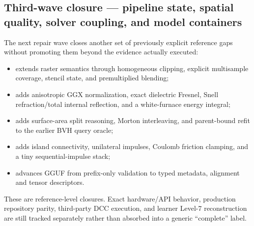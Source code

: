 \subsection{Third-wave closure --- pipeline state, spatial quality, solver coupling, and model containers}\label{appendix-2358b21a702d-third-wave-closure-pipeline-state-spatial-quality-solver-coupling-and-model-containers}

\hypertarget{appendix-2358b21a702d-third-wave-closure-pipeline-state-spatial-quality-solver-coupling-and-model-containers}{}

The next repair wave closes another set of previously explicit reference gaps without promoting them beyond the evidence actually executed:

\begin{itemize}
\tightlist
\item
   extends raster semantics through homogeneous clipping, explicit multisample coverage, stencil state, and premultiplied blending;
\item
   adds anisotropic GGX normalization, exact dielectric Fresnel, Snell refraction/total internal reflection, and a white-furnace energy integral;
\item
   adds surface-area split reasoning, Morton interleaving, and parent-bound refit to the earlier BVH query oracle;
\item
   adds island connectivity, unilateral impulses, Coulomb friction clamping, and a tiny sequential-impulse stack;
\item
   advances GGUF from prefix-only validation to typed metadata, alignment and tensor descriptors.
\end{itemize}

These are reference-level closures. Exact hardware/API behavior, production repository parity, third-party DCC execution, and learner Level-7 reconstruction are still tracked separately rather than absorbed into a generic ``complete'' label.

